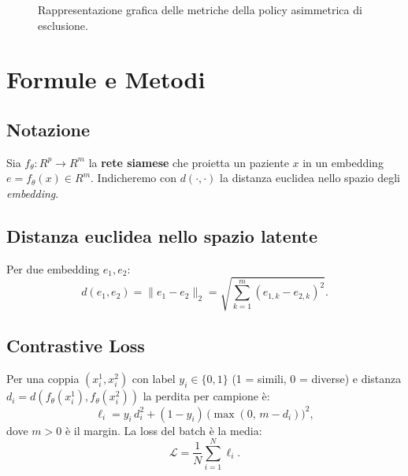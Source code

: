 \documentclass{article}
\begin{document}
\vspace{0.5cm}
\begin{figure}[h!]
\centering
\begin{subfigure}
\begin{コミュニケーション}
\end{コミュニケーション}
\end{subfigure}
\caption{Rappresentazione grafica delle metriche della policy asimmetrica di esclusione.}
\label{fig:grafico_risultati}
\end{figure}
        
\newpage
\section{Formule e Metodi}

\subsection*{Notazione}
Sia $f_{\theta}:{R}^p\to{R}^m$ la \textbf{rete siamese} che proietta un paziente $x$ in un embedding $e=f_{\theta}(x)\in{R}^m$. Indicheremo con $d(\cdot,\cdot)$ la distanza euclidea nello spazio degli \textit{embedding}.

\subsection*{Distanza euclidea nello spazio latente}
Per due embedding $e_1, e_2$:
$$
d(e_1,e_2) = \|e_1 - e_2\|_2 = \sqrt{\sum_{k=1}^{m} (e_{1,k}-e_{2,k})^2}.
$$

\subsection*{Contrastive Loss}
Per una coppia $(x_i^1,x_i^2)$ con label $y_i\in\{0,1\}$ (1 = simili, 0 = diverse) e distanza $d_i=d(f_{\theta}(x_i^1),f_{\theta}(x_i^2))$ la perdita per campione è:
$$
\ell_i = y_i\, d_i^2 + (1-y_i)\,\big(\max(0,\,m - d_i)\big)^2,
$$
dove $m>0$ è il margin. La loss del batch è la media:
$$
\mathcal{L} = \frac{1}{N}\sum_{i=1}^N \ell_i.
$$
\end{document}
